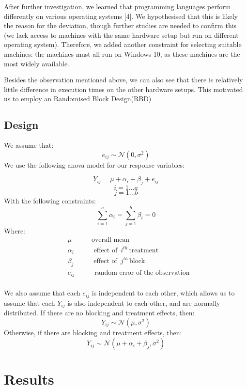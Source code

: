 \documentclass[12pt,halfline,a4paper,]{ouparticle}
\begin{document}
After further investigation, we learned that programming languages
perform differently on various operating systems {[}4{]}. We
hypothesised that this is likely the reason for the deviation, though
further studies are needed to confirm this (we lack access to machines
with the same hardware setup but run on different operating system).
Therefore, we added another constraint for selecting suitable machines:
the machines must all run on Windows 10, as these machines are the most
widely available.

Besides the observation mentioned above, we can also see that there is
relatively little difference in execution times on the other hardware
setups. This motivated us to employ an Randomised Block Design(RBD)

\subsection{Design}\label{design}

We assume that: \[
e_{ij} \sim \mathcal{N}(0, \sigma^2)
\] We use the following anova model for our response variables:

\[
Y_{ij} = \mu + \alpha_i + \beta_j+ e_{ij}
\] \[
i = 1 ...a
\] \[
j = 1 ...b
\] With the following constraints: \[
\sum_{i=1}^a \alpha_i = \sum_{j=1}^b \beta_i =0 
\] Where: \[
\begin{aligned}
&\mu\hspace{35pt}  \text{overall mean} \\
&\alpha_i\hspace{35pt} \text{effect of }\, i^{th}\, \text{treatment}\\
&\beta_j\hspace{35pt} \text{effect of }\, j^{th}\, \text{block}\\
&e_{ij}\hspace{35pt} \text{random error of the observation}\\
\end{aligned}
\]

We also assume that each \(e_{ij}\) is independent to each other, which
allows us to assume that each \(Y_{ij}\) is also independent to each
other, and are normally distributed. If there are no blocking and
treatment effects, then: \[
Y_{ij} \sim \mathcal{N}(\mu, \sigma^2)
\] Otherwise, if there are blocking and treatment effects, then: \[
Y_{ij} \sim \mathcal{N}(\mu + \alpha_i + \beta_j, \sigma^2)
\]

\newpage

\section{Results}\label{results}
\end{document}
